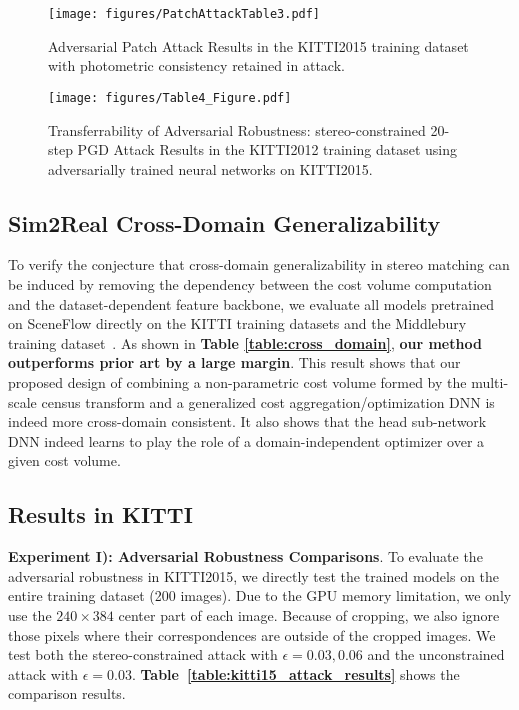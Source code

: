 \documentclass[10pt,twocolumn,letterpaper]{article}
\begin{document}
\begin{figure*} [t]
\begin{center}
\texttt{[image: figures/PatchAttackTable3.pdf]}
\end{center}
   \caption{Adversarial Patch Attack Results in the KITTI2015 training dataset with photometric consistency retained in attack.}
\label{fig:patch_attack_kitti}
\end{figure*}

\begin{figure*} [t]
\begin{center}
\texttt{[image: figures/Table4\_Figure.pdf]}
\end{center}
   \caption{Transferrability of Adversarial Robustness: stereo-constrained 20-step PGD Attack Results in the KITTI2012 training dataset using adversarially trained neural networks on KITTI2015.}
\label{fig:trans_kitti12_attack_results}
\end{figure*}



\subsection{Sim2Real Cross-Domain Generalizability}
To verify the conjecture that cross-domain generalizability in stereo matching can be induced by removing the dependency between the cost volume computation and the dataset-dependent feature backbone, we evaluate all models pretrained on SceneFlow directly on the KITTI training datasets and the Middlebury training dataset~\cite{scharstein2014high}. As shown in \textbf{Table \ref{table:cross_domain}}, \textbf{our method outperforms prior art by a large margin}. This result shows that our proposed design of combining a non-parametric cost volume formed by the multi-scale census transform and a generalized cost aggregation/optimization DNN is indeed more cross-domain consistent. It also shows that the head sub-network DNN indeed learns to play the role of a domain-independent optimizer over a given cost volume.


\subsection{Results in KITTI}
\textbf{Experiment I): Adversarial Robustness Comparisons}. To evaluate the adversarial robustness in KITTI2015, we directly test the trained models on the entire training dataset (200 images).
Due to the GPU memory limitation, we only use the $240\times384$ center part of each image. Because of cropping, we also ignore those pixels where their correspondences are outside of the cropped images. We test both the stereo-constrained attack with $\epsilon=0.03,0.06$ and the unconstrained attack with $\epsilon=0.03$.  \textbf{Table~\ref{table:kitti15_attack_results}} shows the comparison results. 
\end{document}
